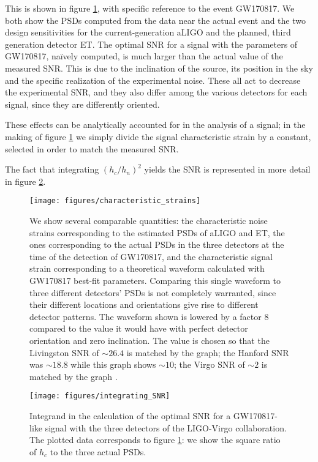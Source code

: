 \documentclass[main.tex]{subfiles}
\begin{document}
This is shown in figure \ref{fig:characteristic_strains}, with specific reference to the event GW170817. We both show the \acp{PSD} computed from the data near the actual event and the two design sensitivities for the current-generation \ac{aLIGO} and the planned, third generation detector \ac{ET}. 
The optimal \ac{SNR} for a signal with the parameters of GW170817, naïvely computed, is much larger than the actual value of the measured \ac{SNR}. This is due to the inclination of the source, its position in the sky and the specific realization of the experimental noise. 
These all act to decrease the experimental \ac{SNR}, and they also differ among the various detectors for each signal, since they are differently oriented. 

These effects can be analytically accounted for in the analysis of a signal; in the making of figure \ref{fig:characteristic_strains} we simply divide the signal characteristic strain by a constant, selected in order to match the measured \ac{SNR}. 

The fact that integrating \((h_c / h_n)^2\) yields the \ac{SNR} is represented in more detail in figure \ref{fig:integrating_SNR}.

\begin{figure}[t]
\centering
\texttt{[image: figures/characteristic\_strains]}
\caption{We show several comparable quantities: the characteristic noise strains corresponding to the estimated 
\acp{PSD} of \ac{aLIGO} and \ac{ET}, the ones corresponding to the actual \acp{PSD} in the three detectors at the time of the detection of GW170817, and the characteristic signal strain corresponding to a theoretical waveform calculated with GW170817 best-fit parameters. 
Comparing this single waveform to three different detectors' \acp{PSD} is not completely warranted, since their different locations and orientations give rise to different detector patterns.
The waveform shown is lowered by a factor \(8\) compared to the value it would have with perfect detector orientation and zero inclination. The value is chosen so that the Livingston \ac{SNR} of \(\sim 26.4\) is matched by the graph; the Hanford \ac{SNR} was \(\sim 18.8\) while this graph shows \(\sim 10\); the Virgo \ac{SNR} of \(\sim 2\) is matched by the graph \cite{abbottGW170817ObservationGravitational2017}.}
\label{fig:characteristic_strains}
\end{figure}

\begin{figure}[ht]
\centering
\texttt{[image: figures/integrating\_SNR]}
\caption{Integrand in the calculation of the optimal \ac{SNR} for a GW170817-like signal with the three detectors of the \ac{LIGO}-Virgo collaboration. The plotted data corresponds to figure \ref{fig:characteristic_strains}: we show the square ratio of \(h_c\) to the three actual \acp{PSD}.}
\label{fig:integrating_SNR}
\end{figure}
\end{document}

